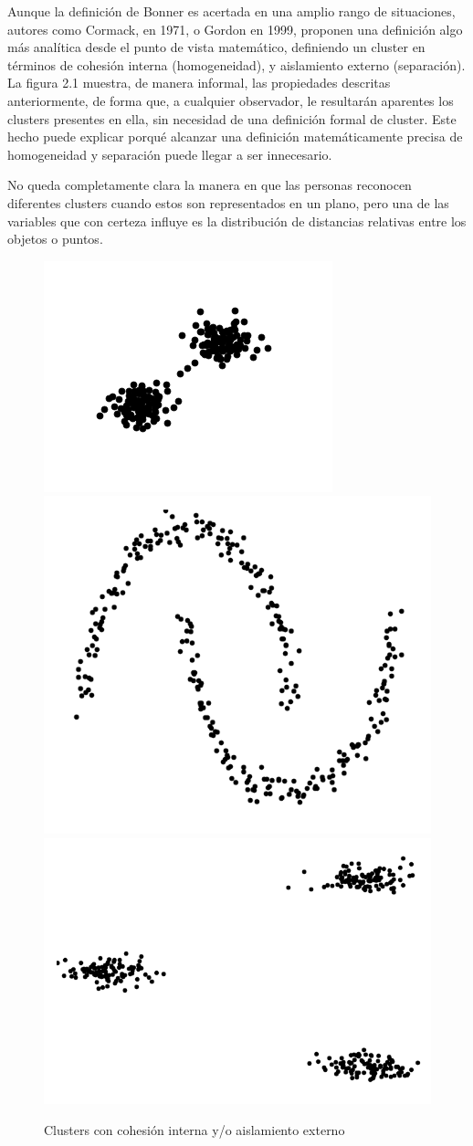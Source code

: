 Aunque la definición de Bonner es acertada en una amplio rango de situaciones, autores como Cormack, en 1971, o Gordon en 1999, proponen una definición algo más analítica desde el punto de vista matemático, definiendo un cluster en términos de cohesión interna (homogeneidad), y aislamiento externo (separación). La figura 2.1 muestra, de manera informal, las propiedades descritas anteriormente, de forma que, a cualquier observador, le resultarán aparentes los clusters presentes en ella, sin necesidad de una definición formal de cluster. Este hecho puede explicar porqué alcanzar una definición matemáticamente precisa de homogeneidad y separación puede llegar a ser innecesario.

No queda completamente clara la manera en que las personas reconocen diferentes clusters cuando estos son representados en un plano, pero una de las variables que con certeza influye es la distribución de distancias relativas entre los objetos o puntos.

\clearpage

\begin{figure}[bth]
	\myfloatalign
	{\includegraphics[width=.3\linewidth]{imagenes/c2/TwoBasicsClusters}}
	{\includegraphics[width=.3\linewidth]{imagenes/c2/MoonsBasics}}
	{\includegraphics[width=.3\linewidth]{imagenes/c2/ThreeBasicClusters}}
	\caption[Clusters con cohesión interna y/o aislamiento externo]{Clusters con cohesión interna y/o aislamiento externo}\label{fig:figure1}
\end{figure}

